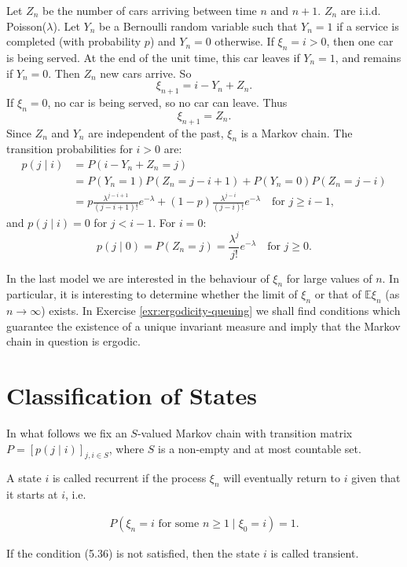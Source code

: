 \begin{Solution}
Let $Z_n$ be the number of cars arriving between time $n$ and $n+1$. $Z_n$ are i.i.d. Poisson($\lambda$). Let $Y_n$ be a Bernoulli random variable such that $Y_n = 1$ if a service is completed (with probability $p$) and $Y_n = 0$ otherwise.
If $\xi_n = i > 0$, then one car is being served. At the end of the unit time, this car leaves if $Y_n = 1$, and remains if $Y_n = 0$. Then $Z_n$ new cars arrive. So
\[
\xi_{n+1} = i - Y_n + Z_n.
\]
If $\xi_n = 0$, no car is being served, so no car can leave. Thus
\[
\xi_{n+1} = Z_n.
\]
Since $Z_n$ and $Y_n$ are independent of the past, $\xi_n$ is a Markov chain. The transition probabilities for $i > 0$ are:
\begin{align*}
p(j \mid i) &= P(i - Y_n + Z_n = j) \\
&= P(Y_n = 1) P(Z_n = j - i + 1) + P(Y_n = 0) P(Z_n = j - i) \\
&= p \frac{\lambda^{j-i+1}}{(j-i+1)!} e^{-\lambda} + (1-p) \frac{\lambda^{j-i}}{(j-i)!} e^{-\lambda} \quad \text{for } j \geq i-1,
\end{align*}
and $p(j \mid i) = 0$ for $j < i-1$.
For $i = 0$:
\[
p(j \mid 0) = P(Z_n = j) = \frac{\lambda^j}{j!} e^{-\lambda} \quad \text{for } j \geq 0.
\]
\end{Solution}

\begin{Remark}
\label{rem:queuing-large-n}
In the last model we are interested in the behaviour of $\xi_n$ for large values of $n$. In particular, it is interesting to determine whether the limit of $\xi_n$ or that of $\mathbb{E}\xi_n$ (as $n\to\infty$) exists. In Exercise \ref{exr:ergodicity-queuing} we shall find conditions which guarantee the existence of a unique invariant measure and imply that the Markov chain in question is ergodic.
\end{Remark}

\section{Classification of States}
\label{sec:classification-states}

In what follows we fix an $S$-valued Markov chain with transition matrix $P = [p(j \mid i)]_{j,i\in S}$, where $S$ is a non-empty and at most countable set.

\begin{Definition}
\label{def:recurrent-transient}
A state $i$ is called recurrent if the process $\xi_n$ will eventually return to $i$ given that it starts at $i$, i.e.

\begin{align}
P(\xi_n = i \text{ for some } n \geq 1 \mid \xi_0 = i) = 1. \tag{5.36}
\end{align}

If the condition (5.36) is not satisfied, then the state $i$ is called transient.
\end{Definition}

